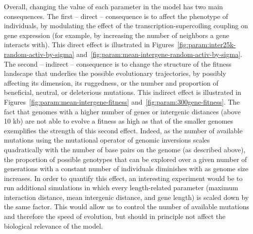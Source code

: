 Overall, changing the value of each parameter in the model has two main consequences.
The first -- direct -- consequence is to affect the phenotype of individuals, by modulating the effect of the transcription-supercoiling coupling on gene expression (for example, by increasing the number of neighbors a gene interacts with).
This direct effect is illustrated in Figures~\ref{fig:param:inter25k-random-activ-by-sigma} and~\ref{fig:param:mean-intergene-random-activ-by-sigma}.
The second -- indirect -- consequence is to change the structure of the fitness landscape that underlies the possible evolutionary trajectories, by possibly affecting its dimension, its ruggedness, or the number and proportion of beneficial, neutral, or deleterious mutations.
This indirect effect is illustrated in Figures~\ref{fig:param:mean-intergene-fitness} and~\ref{fig:param:300gene-fitness}.
The fact that genomes with a higher number of genes or intergenic distances (above 10 kb) are not able to evolve a fitness as high as that of the smaller genomes exemplifies the strength of this second effect.
Indeed, as the number of available mutations using the mutational operator of genomic inversions scales quadratically with the number of base pairs on the genome (as described above), the proportion of possible genotypes that can be explored over a given number of generations with a constant number of individuals diminishes with as genome size increases.
In order to quantify this effect, an interesting experiment would be to run additional simulations in which every length-related parameter (maximum interaction distance, mean intergenic distance, and gene length) is scaled down by the same factor.
This would allow us to control the number of available mutations and therefore the speed of evolution, but should in principle not affect the biological relevance of the model.

